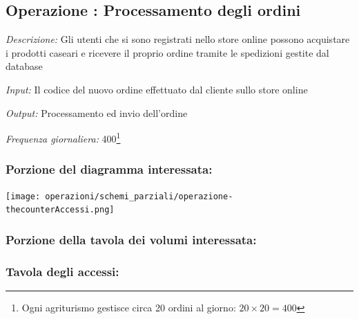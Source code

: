 \documentclass[12pt,a4paper]{article}
\begin{document}
\subsection*{Operazione \thecounterAccessi{}: Processamento degli ordini}
\noindent\textit{Descrizione:} Gli utenti che si sono registrati nello store online possono acquistare i prodotti caseari e ricevere il proprio ordine tramite le spedizioni gestite dal database

\noindent\textit{Input:} Il codice del nuovo ordine effettuato dal cliente sullo store online

\noindent\textit{Output:} Processamento ed invio dell'ordine

\noindent\textit{Frequenza giornaliera:} 400\footnote{Ogni agriturismo gestisce circa 20 ordini al giorno: $20\times 20= 400$}

\subsubsection*{Porzione del diagramma interessata:}

\texttt{[image: operazioni/schemi\_parziali/operazione-\\thecounterAccessi.png]} 
\subsubsection*{Porzione della tavola dei volumi interessata:}

\subsubsection*{Tavola degli accessi:}
\end{document}
